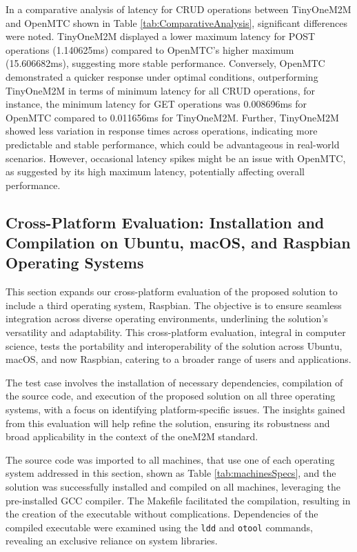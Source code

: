 \documentclass[a4paper,fleqn]{cas-dc}
\begin{document}
In a comparative analysis of latency for CRUD operations between TinyOneM2M and OpenMTC shown in Table \ref{tab:ComparativeAnalysis}, significant differences were noted. TinyOneM2M displayed a lower maximum latency for POST operations (1.140625ms) compared to OpenMTC's higher maximum (15.606682ms), suggesting more stable performance. Conversely, OpenMTC demonstrated a quicker response under optimal conditions, outperforming TinyOneM2M in terms of minimum latency for all CRUD operations, for instance, the minimum latency for GET operations was 0.008696ms for OpenMTC compared to 0.011656ms for TinyOneM2M. Further, TinyOneM2M showed less variation in response times across operations, indicating more predictable and stable performance, which could be advantageous in real-world scenarios. However, occasional latency spikes might be an issue with OpenMTC, as suggested by its high maximum latency, potentially affecting overall performance.

\subsection{Cross-Platform Evaluation: Installation and Compilation on Ubuntu, macOS, and Raspbian Operating Systems}

This section expands our cross-platform evaluation of the proposed solution to include a third operating system, Raspbian. The objective is to ensure seamless integration across diverse operating environments, underlining the solution's versatility and adaptability. This cross-platform evaluation, integral in computer science, tests the portability and interoperability of the solution across Ubuntu, macOS, and now Raspbian, catering to a broader range of users and applications.

The test case involves the installation of necessary dependencies, compilation of the source code, and execution of the proposed solution on all three operating systems, with a focus on identifying platform-specific issues. The insights gained from this evaluation will help refine the solution, ensuring its robustness and broad applicability in the context of the oneM2M standard.

The source code was imported to all machines, that use one of each operating system addressed in this section, shown as Table \ref{tab:machinesSpecs}, and the solution was successfully installed and compiled on all machines, leveraging the pre-installed GCC compiler. The Makefile facilitated the compilation, resulting in the creation of the executable without complications. Dependencies of the compiled executable were examined using the \texttt{ldd} and \texttt{otool} commands, revealing an exclusive reliance on system libraries.
\end{document}
